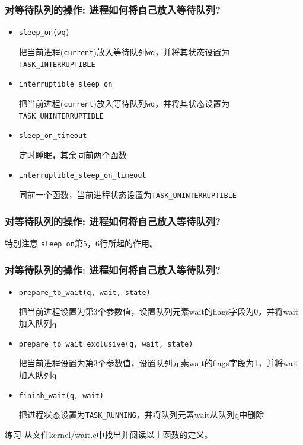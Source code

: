 \documentclass[xcolor=svgnames]{beamer}
\begin{document}
\begin{CJK*}{UTF8}{gbsn}
\begin{frame}[fragile]
\frametitle{对等待队列的操作: 进程如何将自己放入等待队列?}
\begin{itemize}
\item \verb|sleep_on(wq)|

把当前进程(\verb|current|)放入等待队列\verb|wq|，并将其状态设置为
\verb|TASK_INTERRUPTIBLE|
\item \verb|interruptible_sleep_on|

把当前进程(\verb|current|)放入等待队列\verb|wq|，并将其状态设置为
\verb|TASK_UNINTERRUPTIBLE|
\item \verb|sleep_on_timeout|

定时睡眠，其余同前两个函数
\item \verb|interruptible_sleep_on_timeout|

同前一个函数，当前进程状态设置为\verb|TASK_UNINTERRUPTIBLE|
\end{itemize}
\end{frame}

\begin{frame}[fragile]
\frametitle{对等待队列的操作: 进程如何将自己放入等待队列?}
\lstsleepon
\begin{block}{特别注意}
\verb|sleep_on|第5，6行所起的作用。
\end{block}
\end{frame}

\begin{frame}[fragile]
\frametitle{对等待队列的操作: 进程如何将自己放入等待队列?}
\begin{itemize}
\item \verb|prepare_to_wait(q, wait, state)|

把当前进程设置为第3个参数值，设置队列元素wait的flags字段为0，并将wait加入队列q
\item \verb|prepare_to_wait_exclusive(q, wait, state)|

把当前进程设置为第3个参数值，设置队列元素wait的flags字段为1，并将wait加入队列q
\item \verb|finish_wait(q, wait)|

把进程状态设置为\verb|TASK_RUNNING|，并将队列元素wait从队列q中删除
\end{itemize}
\begin{block}{练习}
从文件kernel/wait.c中找出并阅读以上函数的定义。
\end{block}
\end{frame}


\end{CJK*}
\end{document}
